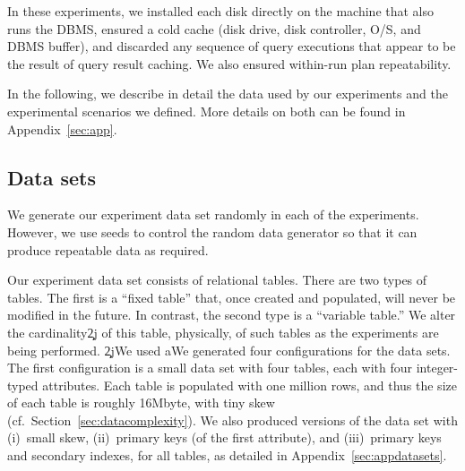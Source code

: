 \documentclass[prodmode,acmtods]{acmsmall}
\begin{document}

In these experiments, we  installed each disk directly
on the machine that also runs the DBMS, ensured a cold cache (disk drive,
disk controller, O/S, and DBMS buffer), and discarded any sequence of query
executions that appear to be the result of query result caching. We also
ensured within-run plan repeatability.

In the following, we describe in detail the data used by our experiments and
the experimental scenarios we defined. More details on both
can be found in Appendix~\ref{sec:app}.

\subsection{Data sets}\label{sec:datasets}
We generate our experiment data set randomly in each of the experiments. However, we
use seeds to control the random data generator so that it can produce
repeatable data as required.

Our experiment data set consists of relational tables. There are two types of
tables. The first is a ``fixed table'' that, once created and
populated, will never be modified in the future.  In contrast, the second
type is a ``variable table.'' We alter the cardinality\c2j{ of
  this table}{, physically, of such tables} as the experiments are being performed. 
\c2j{We used a}{We generated four configurations for the data sets. The first configuration
is a small} data set with four tables, each with four integer-typed
attributes. Each table is populated with one million rows, and thus the size
of each table is roughly 16Mbyte, with tiny skew (cf.~Section~\ref{sec:datacomplexity}). We also produced versions of the data set
with (i)~small skew, (ii)~primary keys (of the first attribute), and (iii)~primary
keys and secondary indexes, for all tables, as detailed in Appendix~\ref{sec:appdatasets}.
\end{document}
